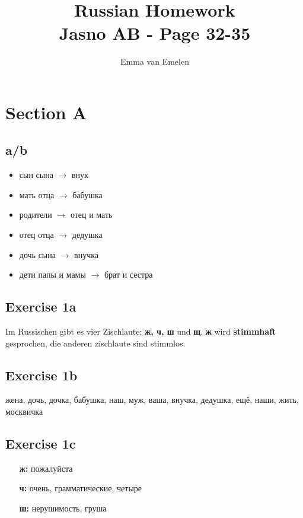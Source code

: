 \documentclass[a4paper, 11pt]{article}
\author{Emma van Emelen}
\title{Russian Homework\\\Large Jasno AB - Page 32-35}
\begin{document}
     \maketitle
     \newpage
     \tableofcontents
     \newpage

     \section{Section A}
     \subsection{a/b}
     \begin{itemize}
       \item сын сына $\rightarrow$ внук
       \item мать отца $\rightarrow$ бабушка
       \item родители $\rightarrow$ отец и мать
       \item отец отца $\rightarrow$ дедушка
       \item дочь сына $\rightarrow$ внучка
       \item дети папы и мамы $\rightarrow$ брат и сестра
     \end{itemize}
     \subsection{Exercise 1a}
     Im Russischen gibt es vier Zischlaute: \textbf{ж, ч, ш} und \textbf{щ}.
     \textbf{ж} wird \textbf{stimmhaft} gesprochen, die anderen zischlaute sind stimmlos.
     \subsection{Exercise 1b}
     жена, дочь, дочка, бабушка, наш, муж, ваша, внучка, дедушка, ещё, наши, жить, москвичка
     \subsection{Exercise 1c}
     \begin{itemize}
      \item[\textbf{ж:}] пожалуйста
      \item[\textbf{ч:}] очень, грамматические, четыре
      \item[\textbf{ш:}] нерушимость, груша
     \end{itemize}
\end{document}

